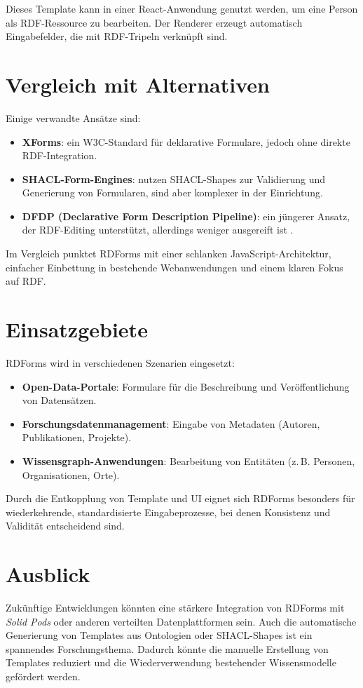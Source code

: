 \documentclass[11pt,a4paper]{article}
\begin{document}
Dieses Template kann in einer React-Anwendung genutzt werden, um eine Person als RDF-Ressource zu bearbeiten. 
Der Renderer erzeugt automatisch Eingabefelder, die mit RDF-Tripeln verknüpft sind. 

\section{Vergleich mit Alternativen}
Einige verwandte Ansätze sind:
\begin{itemize}
  \item \textbf{XForms}: ein W3C-Standard für deklarative Formulare, jedoch ohne direkte RDF-Integration.
  \item \textbf{SHACL-Form-Engines}: nutzen SHACL-Shapes zur Validierung und Generierung von Formularen, sind aber komplexer in der Einrichtung.
  \item \textbf{DFDP (Declarative Form Description Pipeline)}: ein jüngerer Ansatz, der RDF-Editing unterstützt, allerdings weniger ausgereift ist \cite{Smessaert2024}.
\end{itemize}

Im Vergleich punktet RDForms mit einer schlanken JavaScript-Architektur, einfacher Einbettung in bestehende Webanwendungen und einem klaren Fokus auf RDF.

\section{Einsatzgebiete}
RDForms wird in verschiedenen Szenarien eingesetzt:
\begin{itemize}
  \item \textbf{Open-Data-Portale}: Formulare für die Beschreibung und Veröffentlichung von Datensätzen.
  \item \textbf{Forschungsdatenmanagement}: Eingabe von Metadaten (Autoren, Publikationen, Projekte).
  \item \textbf{Wissensgraph-Anwendungen}: Bearbeitung von Entitäten (z.\,B. Personen, Organisationen, Orte).
\end{itemize}

Durch die Entkopplung von Template und UI eignet sich RDForms besonders für wiederkehrende, standardisierte Eingabeprozesse, bei denen Konsistenz und Validität entscheidend sind.

\section{Ausblick}
Zukünftige Entwicklungen könnten eine stärkere Integration von RDForms mit \emph{Solid Pods} oder anderen verteilten Datenplattformen sein. 
Auch die automatische Generierung von Templates aus Ontologien oder SHACL-Shapes ist ein spannendes Forschungsthema. 
Dadurch könnte die manuelle Erstellung von Templates reduziert und die Wiederverwendung bestehender Wissensmodelle gefördert werden.
\end{document}

